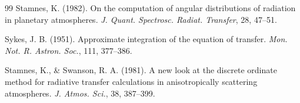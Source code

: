 \documentclass[a4paper,11pt]{article}
\begin{document}
\begin{thebibliography}{99}
Stamnes, K. (1982).
On the computation of angular distributions of radiation in
planetary atmospheres.
\emph{J. Quant. Spectrosc. Radiat. Transfer}, 28, 47--51.

Sykes, J. B. (1951).
Approximate integration of the equation of transfer.
\emph{Mon. Not. R. Astron. Soc.}, 111, 377--386.

Stamnes, K., \& Swanson, R. A. (1981).
A new look at the discrete ordinate method for radiative transfer
calculations in anisotropically scattering atmospheres.
\emph{J. Atmos. Sci.}, 38, 387--399.

\end{thebibliography}
\end{document}
